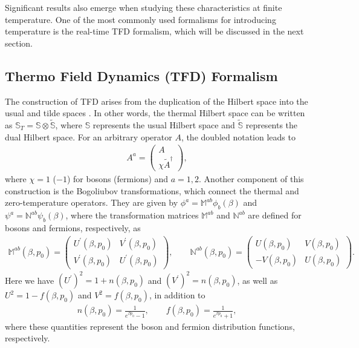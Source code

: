 \documentclass[11pt,showpacs,preprintnumbers,amsmath,amssymb,prd,nofootinbib,superscriptaddress]{revtex4-2}
\begin{document}
Significant results also emerge when studying these characteristics at finite temperature. One of the most commonly used formalisms for introducing temperature is the real-time TFD formalism, which will be discussed in the next section.


\subsection{Thermo Field Dynamics (TFD) Formalism}\label{sectfd}

The construction of TFD arises from the duplication of the Hilbert space into the usual and tilde spaces \textcolor{red}{\cite{temp000}}. In other words, the thermal Hilbert space can be written as \(\mathbb{S}_T = \mathbb{S} \otimes \tilde{\mathbb{S}}\), where \(\mathbb{S}\) represents the usual Hilbert space and \(\tilde{\mathbb{S}}\) represents the dual Hilbert space. For an arbitrary operator $A$, the doubled notation leads to
\begin{eqnarray}
    A^a=\begin{pmatrix}
    A\\\chi\tilde{A}^\dagger
    \end{pmatrix},
\end{eqnarray}
where $\chi=1$ ($-1$) for bosons (fermions) and $a=1,2$. Another component of this construction is the Bogoliubov transformations, which connect the thermal and zero-temperature operators. They are given by $\phi^a=\mathbb{M}^{ab}\phi_b(\beta)$ and $\psi^a=\mathbb{N}^{ab}\psi_b(\beta)$, where the transformation matrices  $\mathbb{M}^{ab}$ and $\mathbb{N}^{ab}$  are defined for bosons and fermions, respectively, as
\begin{eqnarray}
    \mathbb{M}^{ab}(\beta,p_0)=\begin{pmatrix}
        U^\prime(\beta,p_0) & V^\prime(\beta,p_0) \\
        V^\prime(\beta,p_0) & U^\prime(\beta,p_0)
    \end{pmatrix},\quad\quad \mathbb{N}^{ab}(\beta,p_0)=\begin{pmatrix}
        U(\beta,p_0) & V(\beta,p_0) \\
        -V(\beta,p_0) & U(\beta,p_0)
    \end{pmatrix}.\label{eq20}
\end{eqnarray}
Here we have $(U^\prime)^2=1+n(\beta,p_0)$ and $(V^\prime)^2=n(\beta,p_0)$,  as well as $U^2=1-f(\beta,p_0)$ and $V^2=f(\beta,p_0)$, in addition to
\begin{eqnarray}
    n(\beta,p_0)=\frac{1}{e^{\beta p_0}-1},\quad\quad f(\beta,p_0)=\frac{1}{e^{\beta p_0}+1},
\end{eqnarray}
where these quantities represent the boson and fermion distribution functions, respectively. 
\end{document}
